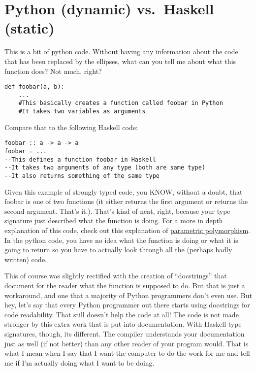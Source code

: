 \documentclass[12pt]{article}
\begin{document}
\section{Python (dynamic) vs.~Haskell
(static)}\label{python-dynamic-vs.haskell-static}

This is a bit of python code. Without having any information about the
code that has been replaced by the ellipses, what can you tell me about
what this function does? Not much, right?

\begin{verbatim}
def foobar(a, b):
    ...
    #This basically creates a function called foobar in Python
    #It takes two variables as arguments
\end{verbatim}

Compare that to the following Haskell code:

\begin{verbatim}
foobar :: a -> a -> a
foobar = ...
--This defines a function foobar in Haskell
--It takes two arguments of any type (both are same type)
--It also returns something of the same type
\end{verbatim}

Given this example of strongly typed code, you KNOW, without a doubt,
that foobar is one of two functions (it either returns the first
argument or returns the second argument. That's it.). That's kind of
neat, right, because your type signature just described what the
function is doing. For a more in depth explanation of this code, check
out this explanation of
\href{http://www.seas.upenn.edu/~cis194/spring13/lectures/05-type-classes.html}{parametric
polymorphism}. In the python code, you have no idea what the function is
doing or what it is going to return so you have to actually look through
all the (perhaps badly written) code.

This of course was slightly rectified with the creation of
``docstrings'' that document for the reader what the function is
supposed to do. But that is just a workaround, and one that a majority
of Python programmers don't even use. But hey, let's say that every
Python programmer out there starts using docstrings for code
readability. That still doesn't help the code at all! The code is not
made stronger by this extra work that is put into documentation. With
Haskell type signatures, though, its different. The compiler understands
your documentation just as well (if not better) than any other reader of
your program would. That is what I mean when I say that I want the
computer to do the work for me and tell me if I'm actually doing what I
want to be doing.
\end{document}
